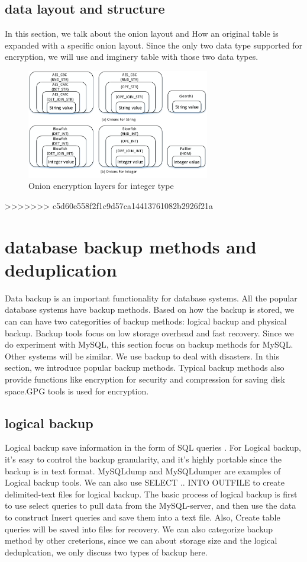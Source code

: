 \subsection{data layout and structure}

In this section, we talk about the onion layout and How an original table is expanded with a specific onion layout. Since the only two data type supported for encryption, we will use and imginery table with those two data types. 



\begin{figure}[tb]
\centering
\includegraphics[width=8cm]{images/Onions.pdf}
\caption{Onion encryption layers for integer type}
\label{fig:stack3}
\end{figure}


>>>>>>> c5d60e558f2f1c9d57ca14413761082b2926f21a
\section{database backup methods and deduplication}

Data backup is an important functionality for database systems. All the popular database systems have backup methods. Based on how the backup is stored, we can can have two categorities of backup methods: logical backup and physical backup. Backup tools focus on low storage overhead and fast recovery. Since we do experiment with MySQL, this section focus on backup methods for MySQL. Other systems will be similar. We use backup to deal with disasters. In this section, we introduce popular backup methods. Typical backup methods also provide functions like encryption for security and compression for saving disk space.GPG tools is used for encryption.


\subsection{logical backup}

Logical backup save information in the form of SQL queries \citep{mysqlbackupdocumentatio}. For Logical backup, it's easy to control the backup granularity, and it's highly portable since the backup is in text format. MySQLdump and MySQLdumper\citep{mysqldumpper} are examples of Logical backup tools. We can also use SELECT .. INTO OUTFILE to create delimited-text files for logical backup. The basic process of logical backup is first to use select queries to pull data from the MySQL-server, and then use the data to construct Insert queries and save them into a text file. Also, Create table queries will be saved into files for recovery. We can also categorize backup method by other creterions, since we can about storage size and the logical deduplcation, we only discuss two types of backup here.


